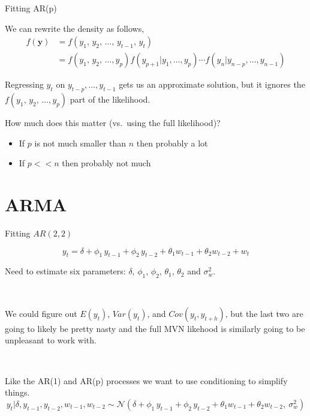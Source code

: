 \documentclass[11pt,ignorenonframetext,]{beamer}
\begin{document}
\begin{frame}[t]{Fitting AR(p)}

We can rewrite the density as follows, \[
\begin{aligned}
f(\bm y)
  &= f(y_1, \,y_2, \,\ldots, \,y_{t-1}, \,y_{t}) \\
  &= f(y_1, \, y_2, \,\ldots, y_p) f(y_{p+1}|y_1,\ldots,y_p) \cdots f(y_{n}|y_{n-p},\ldots,y_{n-1}) 
\end{aligned}
\]

\pause

Regressing \(y_t\) on \(y_{t-p}, \ldots, y_{t-1}\) gets us an
approximate solution, but it ignores the
\(f(y_1, \, y_2, \,\ldots, y_p)\) part of the likelihood.

How much does this matter (vs.~using the full likelihood)?

\begin{itemize}
\item
  If \(p\) is not much smaller than \(n\) then probably a lot
\item
  If \(p << n\) then probably not much
\end{itemize}

\end{frame}

\section{ARMA}\label{arma}

\begin{frame}[t]{Fitting \(AR(2,2)\)}

\[ y_t = \delta + \phi_1 \, y_{t-1} + \phi_2 \, y_{t-2} + \theta_1 w_{t-1} + \theta_2 w_{t-2} + w_t \]

Need to estimate six parameters: \(\delta\), \(\phi_1\), \(\phi_2\),
\(\theta_1\), \(\theta_2\) and \(\sigma_w^2\).

\pause

\(~\)

We could figure out \(E(y_t)\), \(Var(y_t)\), and \(Cov(y_t, y_{t+h})\),
but the last two are going to likely be pretty nasty and the full MVN
likehood is similarly going to be unpleasant to work with.

\pause

\(~\)

Like the AR(1) and AR(p) processes we want to use conditioning to
simplify things.
\[ y_t | \delta, y_{t-1}, y_{t-2}, w_{t-1}, w_{t-2} \sim \mathcal{N}(\delta + \phi_1 \, y_{t-1} + \phi_2 \, y_{t-2} + \theta_1 w_{t-1} + \theta_2 w_{t-2},~\sigma_w^2) \]

\end{frame}
\end{document}
